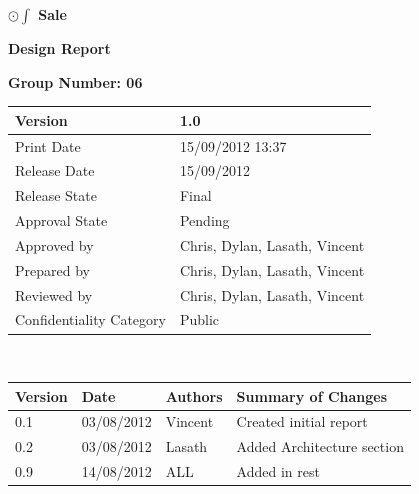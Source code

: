 \documentclass[a4paper]{article}
\begin{document}
\thispagestyle{empty}      %
\begin{center}
\Large\textbf{$\odot\int$ Sale} %

\Large\textbf{Design Report}

\bigskip\large\textbf{Group Number: 06}
\end{center}

\vspace*{16.5cm}
\begin{tabular}{|l|l|}
  \hline
  Version         & 1.0\\\hline
  Print Date      & 15/09/2012 13:37\\\hline
  Release Date    & 15/09/2012\\\hline
  Release State   & Final\\\hline
  Approval State  & Pending\\\hline
  Approved by     & Chris, Dylan, Lasath, Vincent\\\hline
  Prepared by     & Chris, Dylan, Lasath, Vincent\\\hline
  Reviewed by     & Chris, Dylan, Lasath, Vincent\\\hline
  Confidentiality Category  & Public\\\hline
\end{tabular}
\pagebreak

\thispagestyle{plain}     %
\setcounter{page}{1}      %
\renewcommand{\thepage}{\roman{page}}  %

\\[2ex]
\begin{tabular}{|l|l|l|l|}
  \hline
  Version & Date & Authors & Summary of Changes\\\hline\hline
  0.1 & 03/08/2012     &    Vincent     &    Created initial report               \\\hline
   0.2 & 03/08/2012     &    Lasath     &    Added Architecture section               \\\hline
    0.9 & 14/08/2012     &    ALL     &    Added in rest               \\\hline
 
\end{tabular}
\end{document}
